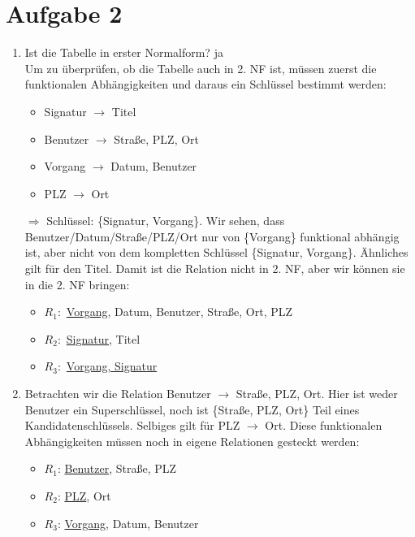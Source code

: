 \documentclass{article}
\begin{document}
	\section*{Aufgabe 2}
	\begin{enumerate}[label=(\alph*)]
		\item Ist die Tabelle in erster Normalform? ja \\
		Um zu überprüfen, ob die Tabelle auch in 2. NF ist, müssen zuerst die funktionalen Abhängigkeiten und daraus ein Schlüssel bestimmt werden:
		\begin{itemize}
			\item Signatur $\to$ Titel
			\item Benutzer $\to$ Straße, PLZ, Ort
			\item Vorgang $\to$ Datum, Benutzer
			\item PLZ $\to$ Ort
		\end{itemize}
		$\Rightarrow$ Schlüssel: \{Signatur, Vorgang\}. Wir sehen, dass Benutzer/Datum/Straße/PLZ/Ort nur von \{Vorgang\} funktional abhängig ist, aber nicht von dem kompletten Schlüssel \{Signatur, Vorgang\}. Ähnliches gilt für den Titel. Damit ist die Relation nicht in 2. NF, aber wir können sie in die 2. NF bringen:
		\begin{itemize}
			\item $R_1:$ \underline{Vorgang}, Datum, Benutzer, Straße, Ort, PLZ
			\item $R_2:$ \underline{Signatur}, Titel
			\item $R_3:$ \underline{Vorgang, Signatur}
		\end{itemize}
		\item Betrachten wir die Relation Benutzer $\to$ Straße, PLZ, Ort. Hier ist weder Benutzer ein Superschlüssel, noch ist \{Straße, PLZ, Ort\} Teil eines Kandidatenschlüssels. Selbiges gilt für PLZ $\to$ Ort. Diese funktionalen Abhängigkeiten müssen noch in eigene Relationen gesteckt werden:
		\begin{itemize}
			\item $R_1$: \underline{Benutzer}, Straße, PLZ
			\item $R_2$: \underline{PLZ}, Ort
			\item $R_3$: \underline{Vorgang}, Datum, Benutzer
		\end{itemize}
	\end{enumerate}
\end{document}
